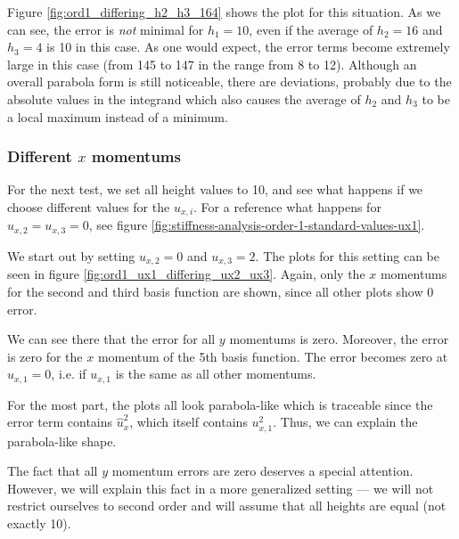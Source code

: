 \documentclass{article}
\renewcommand{\phi}{\varphi}
\begin{document}


Figure \ref{fig:ord1_differing_h2_h3_164} shows the plot for this situation. As we can see, the error is \emph{not} minimal for $h_1=10$, even if the average of $h_2=16$ and $h_3=4$ is 10 in this case. As one would expect, the error terms become extremely large in this case (from 145 to 147 in the range from 8 to 12). Although an overall parabola form is still noticeable, there are deviations, probably due to the absolute values in the integrand which also causes the average of $h_2$ and $h_3$ to be a local maximum instead of a minimum.

\subsubsection{\texorpdfstring{Different $x$ momentums}{Different x momentums}}
\label{sec:stiffness-analysis-ord1-nonstandard-diff-ux}

For the next test, we set all height values to 10, and see what happens if we choose different values for the $u_{x,i}$. For a reference what happens for $u_{x,2}=u_{x,3}=0$, see figure \ref{fig:stiffness-analysis-order-1-standard-values-ux1}.

We start out by setting $u_{x,2}=0$ and $u_{x,3}=2$. The plots for this setting can be seen in figure \ref{fig:ord1_ux1_differing_ux2_ux3}. Again, only the $x$ momentums for the second and third basis function are shown, since all other plots show 0 error.



We can see there that the error for all $y$ momentums is zero. Moreover, the error is zero for the $x$ momentum of the 5th basis function. The error becomes zero at $u_{x,1}=0$, i.e. if $u_{x,1}$ is the same as all other momentums.

For the most part, the plots all look parabola-like which is traceable since the error term contains $\widehat{u}_x^2$, which itself contains $u_{x,1}^2$. Thus, we can explain the parabola-like shape.

The fact that all $y$ momentum errors are zero deserves a special attention. However, we will explain this fact in a more generalized setting --- we will not restrict ourselves to second order and will assume that all heights are equal (not exactly 10).

\end{document}
